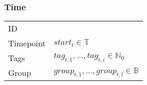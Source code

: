 
\subsubsection{Time}
\begin{tabular}{|p{3.5cm}||p{4.75cm}|}
\hline
    ID                	&  \\
    Timepoint           & $start_t\in\mathbb{T}$ \\
    Tags                & $tag_{t,1},...,tag_{t,i}\in\mathbb{N}_0$ \\
    Group				& $group_{t,1},...,group_{t,l}\in\mathbb{B}$ \\
\hline
\end{tabular}